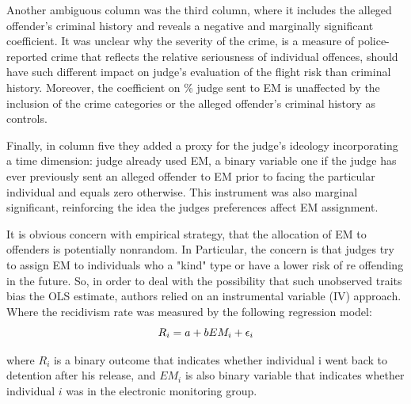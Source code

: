\documentclass[a4paper,12pt]{article}
\begin{document}
Another ambiguous column was the third column, where it includes the alleged offender's criminal history and reveals a negative and marginally significant coefficient. It was unclear why the severity of the crime, is a measure of police-reported crime that reflects the relative seriousness of individual offences, should have such different impact on judge's evaluation of the flight risk than criminal history. Moreover, the coefficient on \% judge sent to EM is unaffected by the inclusion of the crime categories or the alleged offender's criminal history as controls. 

Finally, in column five they added a proxy for the judge's ideology incorporating a time dimension: judge already used EM, a binary variable one if the judge has ever previously sent an alleged offender to EM prior to facing the particular individual and equals zero otherwise. This instrument was also marginal significant, reinforcing the idea the judges preferences affect EM assignment.  

It is obvious concern with empirical strategy, that the allocation of EM to offenders is potentially nonrandom. In Particular, the concern is that judges try to assign EM to individuals who a "kind" type or have a lower risk of re offending in the future. So, in order to deal with the possibility that such unobserved traits bias the OLS estimate, authors relied on an instrumental variable (IV) approach. Where the recidivism rate was measured by the following regression model: 
\begin{equation}
    \centering
    R_i = a + bEM_i + \epsilon_i  
\end{equation}

where $R_i$ is a binary outcome that indicates whether individual i went back to detention after his release, and $EM_i$ is also binary variable that indicates whether individual $i$ was in the electronic monitoring group. 
\end{document}
